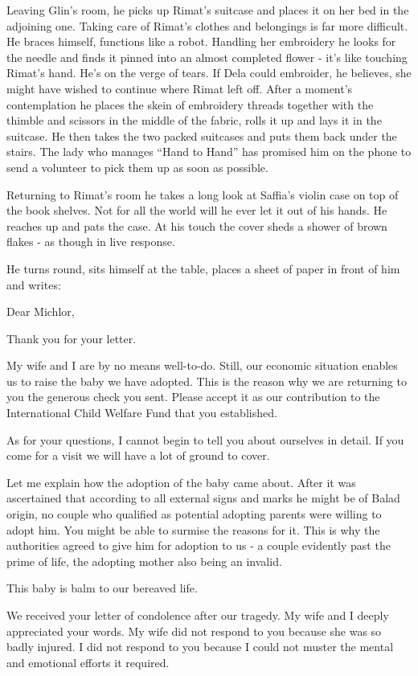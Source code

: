 \documentclass[twoside,11pt]{book}
\begin{document}
Leaving Glin's room, he picks up Rimat's suitcase and places it on her bed in the adjoining one. Taking care of
Rimat's clothes and belongings is far more difficult. He braces himself, functions like a robot. Handling her
embroidery he looks for the needle and finds it pinned into an almost completed flower - it's like touching Rimat's
hand. He's on the verge of tears{.} If Dela could embroider, he believes, she
might have wished to continue where Rimat left off. After a moment's contemplation he places the skein of embroidery
threads together with the thimble and scissors in the middle of the fabric, rolls it up and lays it in the suitcase. He
then takes the two packed suitcases and puts them back under the stairs. The lady who manages ``Hand to
Hand'' has promised him on the phone to send a volunteer to pick them up as soon as possible.

Returning to Rimat's room he takes a long look at Saffia's violin case on top of the book shelves. Not for
all the world will he ever let it out of his hands. He reaches up and pats
the case. At his touch the cover sheds a shower of brown flakes - as though in live response.

He turns round, sits himself at the table, places a sheet of paper in front of him and writes:



Dear Michlor,

Thank you for your letter.

My wife and I are by no means well-to-do. Still, our economic situation enables us to raise the baby we have adopted.
This is the reason why we are returning to you the generous check you sent. Please accept it as our contribution to the
International Child Welfare Fund that you established.

As for your questions, I cannot begin to tell you about ourselves in detail. If you come for a visit we will have a lot
of ground to cover.

Let me explain how the adoption of the baby came about. After it was ascertained that according to all external signs
and marks he might be of Balad origin, no couple who qualified as potential adopting parents were willing to adopt him.
You might be able to surmise the reasons for it. This is why the authorities agreed to give him for adoption to us - a
couple evidently past the prime of life, the adopting mother also being an invalid.

This baby is balm to our bereaved life.

We received your letter of condolence after our tragedy. My wife and I deeply appreciated your words. My wife did not
respond to you because she was so badly injured. I did not respond to you because I could not muster the mental and
emotional efforts it required.
\end{document}
